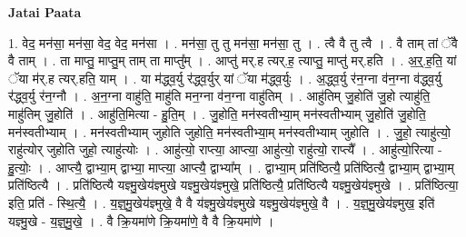 \documentclass[17pt]{extarticle}
\begin{document}
\textbf{Jatai Paata} \newline

1. वेद॒ मन॑सा॒ मन॑सा॒ वेद॒ वेद॒ मन॑सा । . मन॑सा॒ तु तु मन॑सा॒ मन॑सा॒ तु । . त्वै वै तु त्वै । . वै ताम् तां ॅवै वै ताम् । . ता माप्तु॒ माप्तु॒म् ताम् ता माप्तु᳚म् । . आप्तु॑ मर्.ह त्यर्.ह॒ त्याप्तु॒ माप्तु॑ मर्.हति । . अ॒र्॒.ह॒ति॒ यां ॅया म॑र्.ह त्यर्.हति॒ याम् । . या म॑द्ध्व॒र्यु र॑द्ध्व॒र्युर् यां ॅया म॑द्ध्व॒र्युः । . अ॒द्ध्व॒र्यु र॑न॒ग्ना व॑न॒ग्ना व॑द्ध्व॒र्यु र॑द्ध्व॒र्यु र॑न॒ग्नौ । . अ॒न॒ग्ना वाहु॑ति॒ माहु॑ति मन॒ग्ना व॑न॒ग्ना वाहु॑तिम् । . आहु॑तिम् जु॒होति॑ जु॒हो त्याहु॑ति॒ माहु॑तिम् जु॒होति॑ । . आहु॑ति॒मित्या - हु॒ति॒म् । . जु॒होति॒ मन॑स्वतीभ्या॒म् मन॑स्वतीभ्याम् जु॒होति॑ जु॒होति॒ मन॑स्वतीभ्याम् । . मन॑स्वतीभ्याम् जुहोति जुहोति॒ मन॑स्वतीभ्या॒म् मन॑स्वतीभ्याम् जुहोति । . जु॒हो॒ त्याहु॑त्यो॒ राहु॑त्योर् जुहोति जुहो॒ त्याहु॑त्योः । . आहु॑त्यो॒ राप्त्या॒ आप्त्या॒ आहु॑त्यो॒ राहु॑त्यो॒ राप्त्यै᳚ । . आहु॑त्यो॒रित्या - हु॒त्योः॒ । . आप्त्यै॒ द्वाभ्या॒म् द्वाभ्या॒ माप्त्या॒ आप्त्यै॒ द्वाभ्या᳚म् । . द्वाभ्या॒म् प्रति॑ष्ठित्यै॒ प्रति॑ष्ठित्यै॒ द्वाभ्या॒म् द्वाभ्या॒म् प्रति॑ष्ठित्यै । . प्रति॑ष्ठित्यै यज्ञ्मु॒खेय॑ज्ञ्मुखे यज्ञ्मु॒खेय॑ज्ञ्मुखे॒ प्रति॑ष्ठित्यै॒ प्रति॑ष्ठित्यै यज्ञ्मु॒खेय॑ज्ञ्मुखे । . प्रति॑ष्ठित्या॒ इति॒ प्रति॑ - स्थि॒त्यै॒ । . य॒ज्ञ्॒मु॒खेय॑ज्ञ्मुखे॒ वै वै य॑ज्ञ्मु॒खेय॑ज्ञ्मुखे यज्ञ्मु॒खेय॑ज्ञ्मुखे॒ वै । . य॒ज्ञ्॒मु॒खेय॑ज्ञ्मुख॒ इति॑ यज्ञ्मु॒खे - य॒ज्ञ्॒मु॒खे॒ । . वै क्रि॒यमा॑णे क्रि॒यमा॑णे॒ वै वै क्रि॒यमा॑णे । \newline
\end{document}
